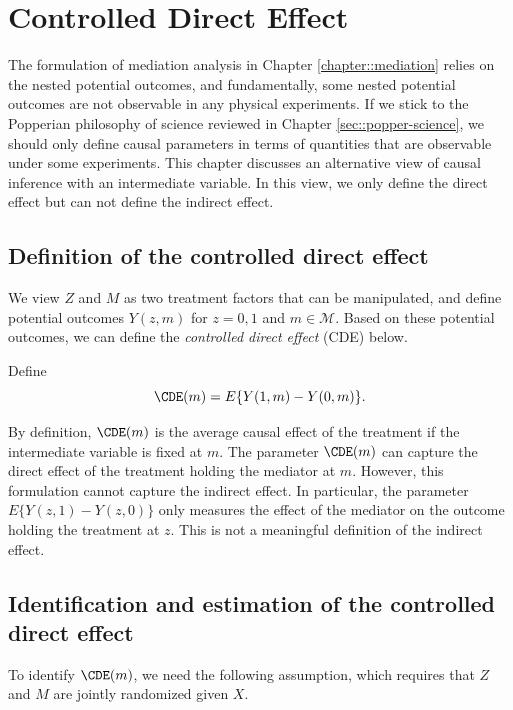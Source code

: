  
\chapter{Controlled Direct Effect}
 \label{chapter::cde}


The formulation of mediation analysis in Chapter \ref{chapter::mediation} relies on the nested potential outcomes, and fundamentally, some nested potential outcomes are not observable in any physical experiments. If we stick to the Popperian philosophy of science reviewed in Chapter  \ref{sec::popper-science}, we should only define causal parameters in terms of quantities that are observable under some experiments. This chapter discusses an alternative view of causal inference with an intermediate variable. In this view, we only define the direct effect but can not define the indirect effect. 





\section{Definition of the controlled direct effect}


We view $Z$ and $M$ as two treatment factors that can be manipulated, and define potential outcomes $Y(z,m)$ for $z=0,1$ and $m\in \mathcal{M}$. Based on these potential outcomes, we can define the {\it controlled direct effect} (CDE) below.

\begin{definition}
[CDE]
Define
$$
\CDE (m)  = E\{  Y(1,m)  - Y(0,m)\}.
$$
\end{definition}
  
 
By definition, $\CDE (m) $ is the average causal effect of the treatment if the intermediate variable is fixed at $m$. 
The parameter $\CDE(m)$ can capture the direct effect of the treatment holding the mediator at $m$. However, this formulation cannot capture the indirect effect. In particular, the parameter
$
E\{  Y(z,1) - Y(z,0)\}
$
only measures the effect of the mediator on the outcome holding the treatment at $z.$ This is not a meaningful definition of the indirect effect. 



\section{Identification and estimation of the controlled direct effect}


To identify $\CDE(m)$, we need the following assumption, which requires that $Z$ and $M$ are jointly randomized given $X$. 


